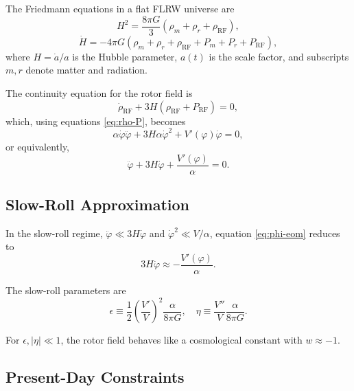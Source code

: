 \documentclass[11pt,a4paper]{article}
\numberwithin{equation}{section}
\theoremstyle{plain}
\theoremstyle{definition}
\theoremstyle{remark}
\begin{document}
The Friedmann equations in a flat FLRW universe are
\begin{equation}
H^2 = \frac{8\pi G}{3}\left(\rho_m + \rho_r + \rho_{\mathrm{RF}}\right),
\label{eq:friedmann1}
\end{equation}
\begin{equation}
\dot{H} = -4\pi G\left(\rho_m + \rho_r + \rho_{\mathrm{RF}} + P_m + P_r + P_{\mathrm{RF}}\right),
\label{eq:friedmann2}
\end{equation}
where $H = \dot{a}/a$ is the Hubble parameter, $a(t)$ is the scale factor, and subscripts $m, r$ denote matter and radiation.

The continuity equation for the rotor field is
\begin{equation}
\dot{\rho}_{\mathrm{RF}} + 3H(\rho_{\mathrm{RF}} + P_{\mathrm{RF}}) = 0,
\label{eq:continuity}
\end{equation}
which, using equations \eqref{eq:rho-P}, becomes
\begin{equation}
\alpha \dot{\varphi}\ddot{\varphi} + 3H\alpha\dot{\varphi}^2 + V'(\varphi)\dot{\varphi} = 0,
\end{equation}
or equivalently,
\begin{equation}
\ddot{\varphi} + 3H\dot{\varphi} + \frac{V'(\varphi)}{\alpha} = 0.
\label{eq:phi-eom}
\end{equation}

\subsection{Slow-Roll Approximation}

In the slow-roll regime, $\ddot{\varphi} \ll 3H\dot{\varphi}$ and $\dot{\varphi}^2 \ll V/\alpha$, equation \eqref{eq:phi-eom} reduces to
\begin{equation}
3H\dot{\varphi} \approx -\frac{V'(\varphi)}{\alpha}.
\label{eq:slow-roll}
\end{equation}

The slow-roll parameters are
\begin{equation}
\epsilon \equiv \frac{1}{2}\left(\frac{V'}{V}\right)^2\frac{\alpha}{8\pi G},
\quad
\eta \equiv \frac{V''}{V}\frac{\alpha}{8\pi G}.
\label{eq:slow-roll-params}
\end{equation}

For $\epsilon, |\eta| \ll 1$, the rotor field behaves like a cosmological constant with $w \approx -1$.

\subsection{Present-Day Constraints}
\end{document}
